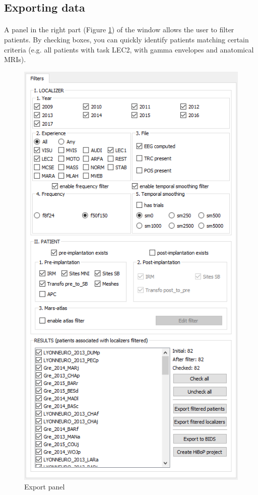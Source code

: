 \documentclass[a4paper]{article}
\begin{document}
\subsection{Exporting data}
\paragraph{} A panel in the right part (Figure \ref{dbManagerFilters}) of the window allows the user to filter patients. By checking boxes, you can quickly identify patients matching certain criteria (e.g. all patients with task LEC2, with gamma envelopes and anatomical MRIs).
\begin{figure}[H]
\begin{center}
\includegraphics[scale=0.5]{DBManagerFilters.png}
\end{center}
\caption{\label{dbManagerFilters}Export panel}
\end{figure}
\end{document}
